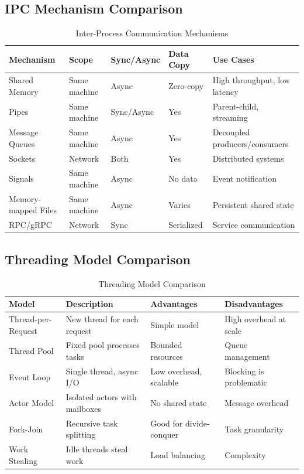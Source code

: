 \documentclass[11pt,letterpaper]{article}
\begin{document}
\subsection{IPC Mechanism Comparison}

\begin{table}[H]
\centering
\caption{Inter-Process Communication Mechanisms}
\small
\begin{tabular}{@{}L{2.5cm}L{2.1cm}L{2.2cm}L{2.2cm}L{\dimexpr\linewidth-9cm-8\tabcolsep\relax}@{}}
\toprule
\textbf{Mechanism} & \textbf{Scope} & \textbf{Sync/Async} & \textbf{Data Copy} & \textbf{Use Cases} \\
\midrule
Shared Memory & Same machine & Async & Zero-copy & High throughput, low latency \\
\addlinespace
Pipes & Same machine & Sync/Async & Yes & Parent-child, streaming \\
\addlinespace
Message Queues & Same machine & Async & Yes & Decoupled producers/consumers \\
\addlinespace
Sockets & Network & Both & Yes & Distributed systems \\
\addlinespace
Signals & Same machine & Async & No data & Event notification \\
\addlinespace
Memory-mapped Files & Same machine & Async & Varies & Persistent shared state \\
\addlinespace
RPC/gRPC & Network & Sync & Serialized & Service communication \\
\bottomrule
\end{tabular}
\end{table}

\subsection{Threading Model Comparison}

\begin{table}[H]
\centering
\caption{Threading Model Comparison}
\small
\begin{tabular}{@{}L{2.5cm}L{4cm}L{3.5cm}L{3cm}@{}}
\toprule
\textbf{Model} & \textbf{Description} & \textbf{Advantages} & \textbf{Disadvantages} \\
\midrule
Thread-per-Request & New thread for each request & Simple model & High overhead at scale \\
\addlinespace
Thread Pool & Fixed pool processes tasks & Bounded resources & Queue management \\
\addlinespace
Event Loop & Single thread, async I/O & Low overhead, scalable & Blocking is problematic \\
\addlinespace
Actor Model & Isolated actors with mailboxes & No shared state & Message overhead \\
\addlinespace
Fork-Join & Recursive task splitting & Good for divide-conquer & Task granularity \\
\addlinespace
Work Stealing & Idle threads steal work & Load balancing & Complexity \\
\bottomrule
\end{tabular}
\end{table}
\end{document}
